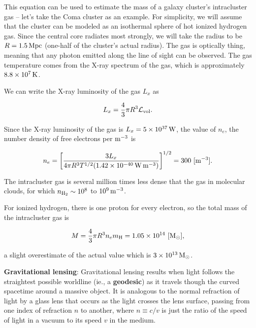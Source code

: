 \documentclass[a4paper,10pt]{article}
\begin{document}
{\noindent}This equation can be used to estimate the mass of a galaxy cluster's intracluster gas -- let's take the Coma cluster as an example. For simplicity, we will assume that the cluster can be modeled as an isothermal sphere of hot ionized hydrogen gas. Since the central core radiates most strongly, we will take the radius to be $R=1.5\,{\rm Mpc}$ (one-half of the cluster's actual radius). The gas is optically thing, meaning that any photon emitted along the line of sight can be observed. The gas temperature comes from the X-ray spectrum of the gas, which is approximately $8.8\times10^7\,{\rm K}$.

{\noindent}We can write the X-ray luminosity of the gas $L_x$ as

\begin{align*}
    L_x = \frac{4}{3}\pi R^3\mathcal{L}_{\rm vol}.
\end{align*}

{\noindent}Since the X-ray luminosity of the gas is $L_x=5\times10^{37}\,{\rm W}$, the value of $n_e$, the number density of free electrons per ${\rm m^{-3}}$ is

\begin{align*}
    n_e = \left[ \frac{3L_x}{4\pi R^3T^{1/2}(1.42\times10^{-40}\,{\rm W\,m^{-3}})} \right]^{1/2} = 300 ~ [{\rm m^{-3}}].
\end{align*}

{\noindent}The intracluster gas is several million times less dense that the gas in molecular clouds, for which $n_{\rm H_2}\sim10^8$ to $10^9\,{\rm m^{-3}}$.

{\noindent}For ionized hydrogen, there is one proton for every electron, so the total mass of the intracluster gas is

\begin{align*}
    M = \frac{4}{3}\pi R^3n_em_{\rm H} = 1.05\times10^{14} ~ [{\rm M_\odot}],
\end{align*}

{\noindent}a slight overestimate of the actual value which is $3\times10^{13}\,{\rm M_\odot}$.

{\noindent}\textbf{Gravitational lensing}: Gravitational lensing results when light follows the straightest possible worldline (ie., a \textbf{geodesic}) as it travels though the curved spacetime around a massive object. It is analogous to the normal refraction of light by a glass lens that occurs as the light crosses the lens surface, passing from one index of refraction $n$ to another, where $n\equiv c/v$ is just the ratio of the speed of light in a vacuum to its speed $v$ in the medium. 
\end{document}
